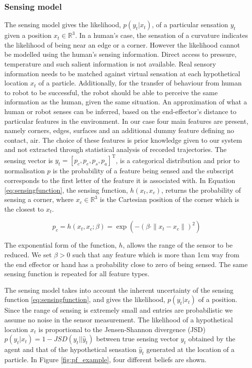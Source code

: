\subsubsection{Sensing model}

The sensing model gives the likelihood, $p(y_t|x_t)$, of a particular sensation $y_t$ given
a position $x_t \in \mathbb{R}^{3}$. In a human's case, the sensation of a curvature indicates the 
likelihood of being near an edge or a corner. However the likelihood cannot be modelled using 
the human's sensing information. Direct access to pressure, temperature and such salient information is not available. 
Real sensory information needs to be matched against virtual sensation at each hypothetical location $x_t$ of a particle. 
Additionally,  for the transfer of behaviour from human to robot to be successful, the robot should be
able to perceive the same information as the human, given the same situation. An approximation of what a human or robot senses 
can be inferred, based on the end-effector's distance to particular features in the environment. In our case four main features 
are present, namely corners, edges, surfaces and an additional dummy feature defining no contact, air. The choice of these features is prior knowledge 
given to our system and not extracted through statistical analysis of recorded trajectories. The sensing vector is $y_t = \left[p_c,p_e,p_s,p_a\right]^{\mathrm{T}}$, 
is a categorical distribution and prior to normalisation $p$ is the probability of a feature being sensed and the subscript corresponds to 
the first letter of the feature it is associated with. In Equation \ref{eq:sensingfunction}, 
the sensing function, $h(x_t,x_c)$, returns the probability of sensing a corner, where $x_c \in \mathbb{R}^3$ is the Cartesian position of the corner which is
the closest to $x_t$. 

\begin{equation}\label{eq:sensingfunction}
  p_c = h(x_t,x_c;\beta) = \exp\left( -\left(\beta \cdot \|x_t - x_c\|\right)^2 \right)
\end{equation}

The exponential form of the function, $h$, allows the range of the sensor to be reduced. We set $\beta > 0$ such that 
any feature which is more than 1cm way from the end effector or hand has a probability close to zero of being sensed. 
The same sensing function is repeated for all feature types.

The sensing model takes into account the inherent uncertainty of the sensing function \ref{eq:sensingfunction}, 
and gives the likelihood, $p(y_t|x_t)$ of a position. Since the range of sensing is extremely small and entries are probabilistic 
we assume no noise in the sensor measurement.
The likelihood of a hypothetical location $x_t$ is proportional to the Jensen-Shannon divergence (JSD) $p(y_t|x_t) = 1 - JSD(y_t||\hat{y}_t)$ between true sensing vector
$y_t$ obtained by the agent and that of the hypothetical sensation $\hat{y}_t$ generated at the location of a particle. In Figure \ref{fig:pf_example}, four 
different beliefs are shown.


